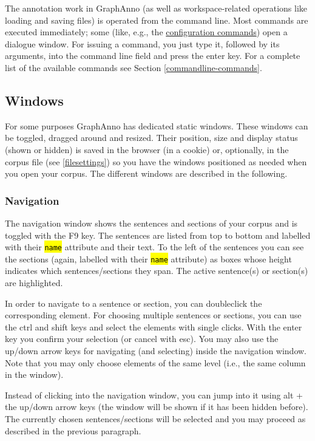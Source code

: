 \documentclass[12pt]{scrartcl}
\newcommand{\code}[1]{\hl{\texttt{#1}}}
\begin{document}
The annotation work in GraphAnno (as well as workspace-related operations like loading and saving files) is operated from the command line.
Most commands are executed immediately; some (like, e.g., the \hyperref[konfiguration]{configuration commands}) open a dialogue window.
For issuing a command, you just type it, followed by its arguments, into the command line field and press the enter key.
For a complete list of the available commands see Section \ref{commandline-commands}.


\subsection{Windows}\label{windows}

For some purposes GraphAnno has dedicated static windows.
These windows can be toggled, dragged around and resized.
Their position, size and display status (shown or hidden) is saved in the browser (in a cookie) or, optionally, in the corpus file (see \ref{filesettings}) so you have the windows positioned as needed when you open your corpus.
The different windows are described in the following.

\subsubsection{Navigation}\label{window-navigation}

The navigation window shows the sentences and sections of your corpus and is toggled with the F9 key.
The sentences are listed from top to bottom and labelled with their \code{name} attribute and their text.
To the left of the sentences you can see the sections (again, labelled with their \code{name} attribute) as boxes whose height indicates which sentences/sections they span.
The active sentence(s) or section(s) are highlighted.

In order to navigate to a sentence or section, you can doubleclick the corresponding element.
For choosing multiple sentences or sections, you can use the ctrl and shift keys and select the elements with single clicks.
With the enter key you confirm your selection (or cancel with esc).
You may also use the up/down arrow keys for navigating (and selecting) inside the navigation window.
Note that you may only choose elements of the same level (i.e., the same column in the window).

Instead of clicking into the navigation window, you can jump into it using alt + the up/down arrow keys (the window will be shown if it has been hidden before).
The currently chosen sentences/sections will be selected and you may proceed as described in the previous paragraph.
\end{document}
